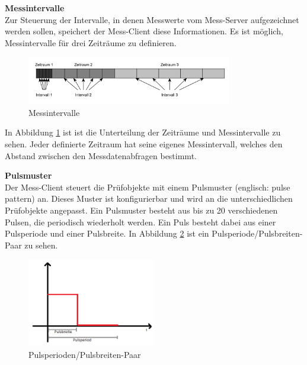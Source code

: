\textbf{Messintervalle}\\
Zur Steuerung der Intervalle, in denen Messwerte vom Mess-Server aufgezeichnet werden sollen, speichert der Mess-Client diese Informationen. Es ist möglich, Messintervalle für drei Zeiträume zu definieren.



\begin{figure}[H]
\begin{center}
\includegraphics[width=0.8\textwidth]{img/general/Messintervalle.pdf}
\caption{Messintervalle}
\label{figure_Messintervalle}
\end{center}
\end{figure}

In Abbildung \ref{figure_Messintervalle} ist ist die Unterteilung der Zeiträume und Messintervalle zu sehen. Jeder definierte Zeitraum hat seine eigenes Messintervall, welches den Abstand zwischen den Messdatenabfragen bestimmt.\ 

\textbf{Pulsmuster}\\
Der Mess-Client steuert die Prüfobjekte mit einem Pulsmuster (englisch: pulse pattern) an. Dieses Muster ist konfigurierbar und wird an die unterschiedlichen Prüfobjekte angepasst. Ein Pulsmuster besteht aus bis zu 20 verschiedenen Pulsen, die periodisch wiederholt werden. Ein Puls besteht dabei aus einer Pulsperiode und einer Pulsbreite. In Abbildung \ref{figure_Pulsepattern} ist ein Pulsperiode/Pulsbreiten-Paar zu sehen.\\



\begin{figure}[H]
\begin{center}
\includegraphics[width=0.5\textwidth]{img/general/PulseMuster.png}
\caption{Pulsperioden/Pulsbreiten-Paar}
\label{figure_Pulsepattern}
\end{center}
\end{figure}


